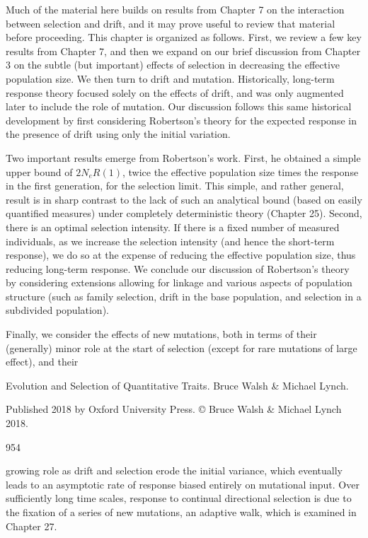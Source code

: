 \documentclass{article}
\begin{document}
Much of the material here builds on results from Chapter 7 on the interaction between selection and drift, and it may prove useful to review that material before proceeding. This chapter is organized as follows. First, we review a few key results from Chapter 7, and then we expand on our brief discussion from Chapter 3 on the subtle (but important) effects of selection in decreasing the effective population size. We then turn to drift and mutation. Historically, long-term response theory focused solely on the effects of drift, and was only augmented later to include the role of mutation. Our discussion follows this same historical development by first considering Robertson's theory for the expected response in the presence of drift using only the initial variation.

Two important results emerge from Robertson’s work. First, he obtained a simple upper bound of  $ 2N_{e}R(1) $, twice the effective population size times the response in the first generation, for the selection limit. This simple, and rather general, result is in sharp contrast to the lack of such an analytical bound (based on easily quantified measures) under completely deterministic theory (Chapter 25). Second, there is an optimal selection intensity. If there is a fixed number of measured individuals, as we increase the selection intensity (and hence the short-term response), we do so at the expense of reducing the effective population size, thus reducing long-term response. We conclude our discussion of Robertson’s theory by considering extensions allowing for linkage and various aspects of population structure (such as family selection, drift in the base population, and selection in a subdivided population).

Finally, we consider the effects of new mutations, both in terms of their (generally) minor role at the start of selection (except for rare mutations of large effect), and their

Evolution and Selection of Quantitative Traits. Bruce Walsh & Michael Lynch.

Published 2018 by Oxford University Press. © Bruce Walsh & Michael Lynch 2018.

954

growing role as drift and selection erode the initial variance, which eventually leads to an asymptotic rate of response biased entirely on mutational input. Over sufficiently long time scales, response to continual directional selection is due to the fixation of a series of new mutations, an adaptive walk, which is examined in Chapter 27.
\end{document}
